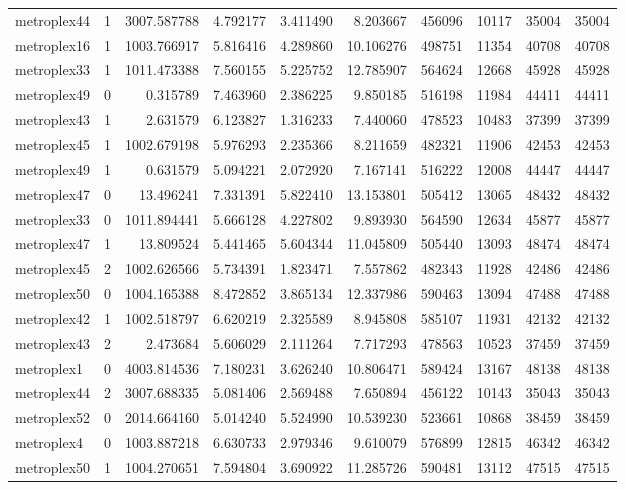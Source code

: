 \begin{longtable}{|l|r|r|r|r|r|r|r|r|r|}
metroplex44 & 1 & 3007.587788 & 4.792177 & 3.411490 & 8.203667 & 456096 & 10117 & 35004 & 35004 \\
metroplex16 & 1 & 1003.766917 & 5.816416 & 4.289860 & 10.106276 & 498751 & 11354 & 40708 & 40708 \\
metroplex33 & 1 & 1011.473388 & 7.560155 & 5.225752 & 12.785907 & 564624 & 12668 & 45928 & 45928 \\
metroplex49 & 0 & 0.315789 & 7.463960 & 2.386225 & 9.850185 & 516198 & 11984 & 44411 & 44411 \\
metroplex43 & 1 & 2.631579 & 6.123827 & 1.316233 & 7.440060 & 478523 & 10483 & 37399 & 37399 \\
metroplex45 & 1 & 1002.679198 & 5.976293 & 2.235366 & 8.211659 & 482321 & 11906 & 42453 & 42453 \\
metroplex49 & 1 & 0.631579 & 5.094221 & 2.072920 & 7.167141 & 516222 & 12008 & 44447 & 44447 \\
metroplex47 & 0 & 13.496241 & 7.331391 & 5.822410 & 13.153801 & 505412 & 13065 & 48432 & 48432 \\
metroplex33 & 0 & 1011.894441 & 5.666128 & 4.227802 & 9.893930 & 564590 & 12634 & 45877 & 45877 \\
metroplex47 & 1 & 13.809524 & 5.441465 & 5.604344 & 11.045809 & 505440 & 13093 & 48474 & 48474 \\
metroplex45 & 2 & 1002.626566 & 5.734391 & 1.823471 & 7.557862 & 482343 & 11928 & 42486 & 42486 \\
metroplex50 & 0 & 1004.165388 & 8.472852 & 3.865134 & 12.337986 & 590463 & 13094 & 47488 & 47488 \\
metroplex42 & 1 & 1002.518797 & 6.620219 & 2.325589 & 8.945808 & 585107 & 11931 & 42132 & 42132 \\
metroplex43 & 2 & 2.473684 & 5.606029 & 2.111264 & 7.717293 & 478563 & 10523 & 37459 & 37459 \\
metroplex1 & 0 & 4003.814536 & 7.180231 & 3.626240 & 10.806471 & 589424 & 13167 & 48138 & 48138 \\
metroplex44 & 2 & 3007.688335 & 5.081406 & 2.569488 & 7.650894 & 456122 & 10143 & 35043 & 35043 \\
metroplex52 & 0 & 2014.664160 & 5.014240 & 5.524990 & 10.539230 & 523661 & 10868 & 38459 & 38459 \\
metroplex4 & 0 & 1003.887218 & 6.630733 & 2.979346 & 9.610079 & 576899 & 12815 & 46342 & 46342 \\
metroplex50 & 1 & 1004.270651 & 7.594804 & 3.690922 & 11.285726 & 590481 & 13112 & 47515 & 47515 \\

\end{longtable}
